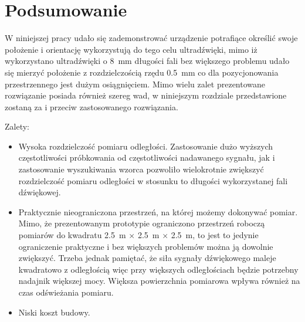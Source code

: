 \chapter{Podsumowanie}

W niniejszej pracy udało się zademonstrować urządzenie potrafiące określić swoje
położenie i orientację wykorzystują do tego celu ultradźwięki,
mimo iż wykorzystano ultradźwięki o \SI{8}{mm} długości fali bez większego problemu
udało się mierzyć położenie z rozdzielczością rzędu \SI{0,5}{mm} co dla 
pozycjonowania przestrzennego jest dużym osiągnięciem.
Mimo wielu zalet prezentowane rozwiązanie posiada również szereg wad, w niniejszym rozdziale
przedstawione zostaną za i przeciw zastosowanego rozwiązania.

Zalety:
\begin{itemize}
 \item Wysoka rozdzielczość pomiaru odległości. Zastosowanie dużo wyższych częstotliwości 
 próbkowania od częstotliwości nadawanego sygnału, jak i zastosowanie wyszukiwania wzorca pozwoliło
 wielokrotnie zwiększyć rozdzielczość pomiaru odległości w stosunku to długości wykorzystanej fali dźwiękowej.
 
 \item Praktycznie nieograniczona przestrzeń, na której możemy dokonywać pomiar. Mimo, że prezentowanym prototypie
 ograniczono przestrzeń roboczą pomiarów do kwadratu \SI{2,5}{m} $\times$ \SI{2,5}{m} $\times$ \SI{2,5}{m},
 to jest to jedynie ograniczenie praktyczne i bez większych problemów można ją dowolnie zwiększyć. Trzeba jednak 
 pamiętać, że siła sygnały dźwiękowego maleje kwadratowo z odległością więc przy większych odległościach
 będzie potrzebny nadajnik większej mocy. Większa powierzchnia pomiarowa wpływa również na czas odświeżania
 pomiaru.

 \item Niski koszt budowy. 
\end{itemize}

